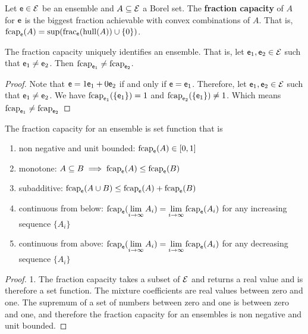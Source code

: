 \begin{mathSection}
	\begin{defn}
		Let $\mathsf{e} \in \mathcal{E}$ be an ensemble and $A \subseteq \mathcal{E}$ a Borel set. The \textbf{fraction capacity} of $A$ for $\mathsf{e}$ is the biggest fraction achievable with convex combinations of $A$. That is, $\mathrm{fcap}_{\mathsf{e}}(A) = \sup(\mathrm{frac}_{\mathsf{e}}(\mathrm{hull}(A))\cup\{0\})$.
	\end{defn}
	
	\begin{coro}
		The fraction capacity uniquely identifies an ensemble. That is, let $\mathsf{e}_1, \mathsf{e}_2 \in \mathcal{E}$ such that $\mathsf{e}_1 \neq \mathsf{e}_2$. Then $\mathrm{fcap}_{\mathsf{e}_1} \neq \mathrm{fcap}_{\mathsf{e}_2}$.
	\end{coro}
	
	\begin{proof}
		Note that $\mathsf{e} = 1 \mathsf{e}_1 + 0 \mathsf{e}_2$ if and only if $\mathsf{e} = \mathsf{e}_1$. Therefore, let $\mathsf{e}_1, \mathsf{e}_2 \in \mathcal{E}$ such that $\mathsf{e}_1 \neq \mathsf{e}_2$. We have $\mathrm{fcap}_{\mathsf{e}_1}(\{\mathsf{e}_1\}) = 1$ and $\mathrm{fcap}_{\mathsf{e}_2}(\{\mathsf{e}_1\}) \neq 1$. Which means $\mathrm{fcap}_{\mathsf{e}_1} \neq \mathrm{fcap}_{\mathsf{e}_2}$
	\end{proof}
	
	\begin{prop}
		The fraction capacity for an ensemble is set function that is
		\begin{enumerate}
			\item non negative and unit bounded: $\mathrm{fcap}_{\mathsf{e}}(A) \in [0,1]$
			\item monotone: $A \subseteq B \implies \mathrm{fcap}_{\mathsf{e}}(A) \leq \mathrm{fcap}_{\mathsf{e}}(B)$
			\item subadditive: $\mathrm{fcap}_{\mathsf{e}}(A \cup B) \leq \mathrm{fcap}_{\mathsf{e}}(A) + \mathrm{fcap}_{\mathsf{e}}(B)$
			\item continuous from below: $\mathrm{fcap}_{\mathsf{e}}(\lim\limits_{i \to \infty} A_i) = \lim\limits_{i \to \infty} \mathrm{fcap}_{\mathsf{e}}(A_i)$ for any increasing sequence $\{A_i\}$
			\item continuous from above: $\mathrm{fcap}_{\mathsf{e}}(\lim\limits_{i \to \infty} A_i) = \lim\limits_{i \to \infty} \mathrm{fcap}_{\mathsf{e}}(A_i)$ for any decreasing sequence $\{A_i\}$
		\end{enumerate}
	\end{prop}
	
	\begin{proof}
		1. The fraction capacity takes a subset of $\mathcal{E}$ and returns a real value and is therefore a set function. The mixture coefficients are real values between zero and one. The supremum of a set of numbers between zero and one is between zero and one, and therefore the fraction capacity for an ensembles is non negative and unit bounded.
		

\end{proof}
\end{mathSection}
